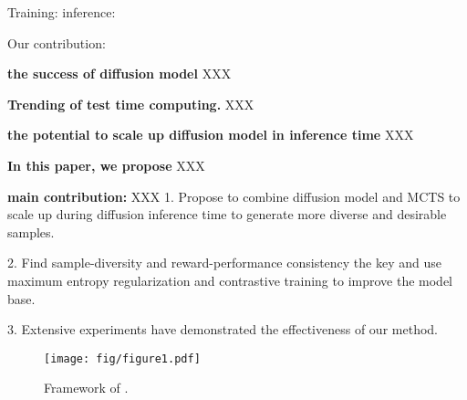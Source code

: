 Training: inference:


Our contribution:



\textbf{the success of diffusion model} XXX


\textbf{Trending of test time computing.} XXX



\textbf{the potential to scale up diffusion model in inference time} XXX

\textbf{In this paper, we propose } XXX

\textbf{main contribution:} XXX
1. Propose to combine diffusion model and MCTS to scale up during diffusion inference time to generate more diverse and desirable samples. 

2. Find sample-diversity and reward-performance consistency the key and use maximum entropy regularization and contrastive training to improve the model base.

3. Extensive experiments have demonstrated the effectiveness of our method.

\begin{figure*}[ht]
\label{fig:figure1}
\vskip 0.2in
\begin{center}
\centerline{\texttt{[image: fig/figure1.pdf]}}
\caption{Framework of \proj. }
\label{icml-historical}
\end{center}
\vskip -0.2in
\end{figure*}